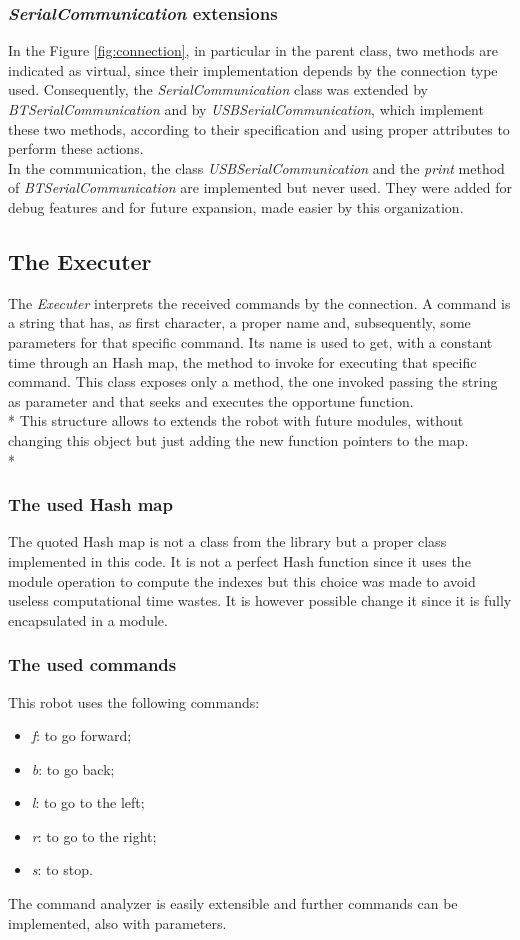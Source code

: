 \subsubsection{\textit{SerialCommunication} extensions}
In the Figure \ref{fig:connection}, in particular in the parent class, two methods are indicated as virtual, since their implementation depends by the connection type used. Consequently, the \textit{SerialCommunication} class was extended by \textit{BTSerialCommunication} and by \textit{USBSerialCommunication}, which implement these two methods, according to their specification and using proper attributes to perform these actions.\\
In the communication, the class \textit{USBSerialCommunication} and the \textit{print} method of \textit{BTSerialCommunication} are implemented but never used. They were added for debug features and for future expansion, made easier by this organization.
\newpage

\subsection{The Executer}
The \textit{Executer} interprets the received commands by the connection. A command is a string that has, as first character, a proper name and, subsequently, some parameters for that specific command. Its name is used to get, with a constant time through an Hash map, the method to invoke for executing that specific command. This class exposes only a method, the one invoked passing the string as parameter and that seeks and executes the opportune function.\\*
This structure allows to extends the robot with future modules, without changing this object but just adding the new function pointers to the map.\\*

\subsubsection{The used Hash map}
The quoted Hash map is not a class from the library but a proper class implemented in this code. It is not a perfect Hash function since it uses the module operation to compute the indexes but this choice was made to avoid useless computational time wastes. It is however possible change it since it is fully encapsulated in a module.\\

\subsubsection{The used commands}
This robot uses the following commands:
\begin{itemize}
	\item \textit{f}: to go forward;
	\item \textit{b}: to go back;
	\item \textit{l}: to go to the left;
	\item \textit{r}: to go to the right;
	\item \textit{s}: to stop.
\end{itemize}
The command analyzer is easily extensible and further commands can be implemented, also with parameters.
\newpage

